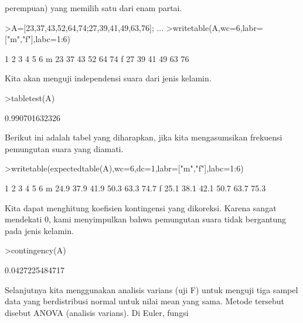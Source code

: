 \documentclass[a4paper,10pt]{article}
\begin{document}
\begin{eulernotebook}
\begin{eulercomment}
\begin{eulercomment}
\begin{eulercomment}
perempuan) yang memilih satu dari enam partai.
\end{eulercomment}
\begin{eulerprompt}
>A=[23,37,43,52,64,74;27,39,41,49,63,76];  ...
>writetable(A,wc=6,labr=["m","f"],labc=1:6)
\end{eulerprompt}
\begin{euleroutput}
             1     2     3     4     5     6
       m    23    37    43    52    64    74
       f    27    39    41    49    63    76
\end{euleroutput}
\begin{eulercomment}
Kita akan menguji independensi suara dari jenis kelamin.
\end{eulercomment}
\begin{eulerprompt}
>tabletest(A)
\end{eulerprompt}
\begin{euleroutput}
  0.990701632326
\end{euleroutput}
\begin{eulercomment}
Berikut ini adalah tabel yang diharapkan, jika kita mengasumsikan
frekuensi pemungutan suara yang diamati.
\end{eulercomment}
\begin{eulerprompt}
>writetable(expectedtable(A),wc=6,dc=1,labr=["m","f"],labc=1:6)
\end{eulerprompt}
\begin{euleroutput}
             1     2     3     4     5     6
       m  24.9  37.9  41.9  50.3  63.3  74.7
       f  25.1  38.1  42.1  50.7  63.7  75.3
\end{euleroutput}
\begin{eulercomment}
Kita dapat menghitung koefisien kontingensi yang dikoreksi. Karena
sangat mendekati 0, kami menyimpulkan bahwa pemungutan suara tidak
bergantung pada jenis kelamin.
\end{eulercomment}
\begin{eulerprompt}
>contingency(A)
\end{eulerprompt}
\begin{euleroutput}
  0.0427225484717
\end{euleroutput}
\begin{eulercomment}
\begin{eulercomment}
\begin{eulercomment}
Selanjutnya kita menggunakan analisis varians (uji F) untuk menguji
tiga sampel data yang berdistribusi normal untuk nilai mean yang sama.
Metode tersebut disebut ANOVA (analisis varians). Di Euler, fungsi

\end{eulercomment}
\end{eulercomment}
\end{eulercomment}
\end{eulercomment}
\end{eulercomment}
\end{eulernotebook}
\end{document}
